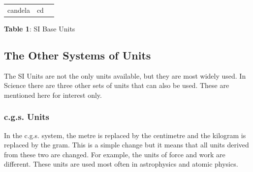 {\begin{center}
\begin{xtabular*}{\mytablewidth}[t]{|p{10\mystarwidth}|p{10\mystarwidth}|p{10\mystarwidth}|}
    
        candela &
    
    
        cd%
     \tabularnewline{}
    \end{xtabular*}
      \end{center}
    \begin{center}{\small\bfseries Table 1}: SI Base Units\end{center}
    
    \addtocounter{footnote}{-0}
    
        }%
      
    \par
  
      
      \label{m30853*uid3}
            \subsection{ The Other Systems of Units}
            \nopagebreak
            
        
        \label{m30853*id62886}The SI Units are not the only units available, but they are most
widely used. In Science there are three other sets of units that
can also be used. These are mentioned here for interest only.\par 
        \label{m30853*uid4}
            \subsubsection{ c.g.s. Units}
            \nopagebreak
            
          
          \label{m30853*id62899}In the c.g.s. system, the metre is replaced by the centimetre and
the kilogram is replaced by the gram. This is a simple change but
it means that all units derived from these two are changed. For
example, the units of force and work are different. These units
are used most often in astrophysics and atomic physics.\par 
        
